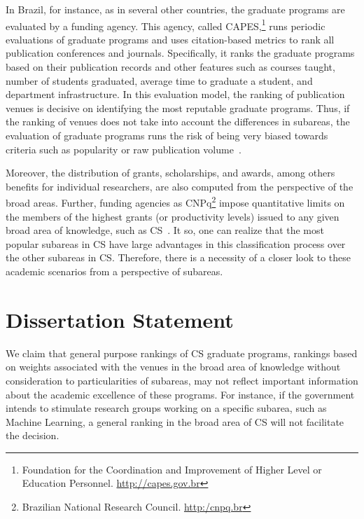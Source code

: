 \documentclass[msc]{ppgccufmg}
\begin{document}
{\color{blue}
In Brazil, for instance, as in several other countries, the graduate programs are evaluated by a funding agency. This agency, called CAPES,\footnote{Foundation for the Coordination and Improvement of Higher Level or Education Personnel. \url{http://capes.gov.br}} runs periodic evaluations of graduate programs and uses citation-based metrics to rank all publication conferences and journals. Specifically, it ranks the graduate programs based on their publication records and other features such as courses taught, number of students graduated, average time to graduate a student, and department infrastructure. In this evaluation model, the ranking of publication venues is decisive on identifying the most reputable graduate programs. Thus, if the ranking of venues does not take into account the differences in subareas, the evaluation of graduate programs runs the risk of being very biased towards criteria such as popularity or raw publication volume~\citep{capes09}.

Moreover, the distribution of grants, scholarships, and awards, among others benefits for individual researchers, are also computed from the perspective of the broad areas. Further, funding agencies as CNPq\footnote{Brazilian National Research Council. \url{http:/cnpq.br}} impose quantitative limits on the members of the highest grants (or productivity levels) issued to any given broad area of knowledge, such as CS~\citep{capes17}. It so, one can realize that the most popular subareas in CS have large advantages in this classification process over the other subareas in CS. 
%
%
Therefore, there is a necessity of a closer look to these academic scenarios from a perspective of subareas.
}

\section{Dissertation Statement}

We claim that general purpose rankings of CS graduate programs, %
rankings based on weights associated with the venues in the broad area of knowledge without consideration to particularities of subareas, may not reflect important information about the academic excellence of these programs. For instance, if the government intends to stimulate research groups working on a specific subarea, such as Machine Learning, a general ranking in the broad area of CS will not facilitate the decision. 
\end{document}
